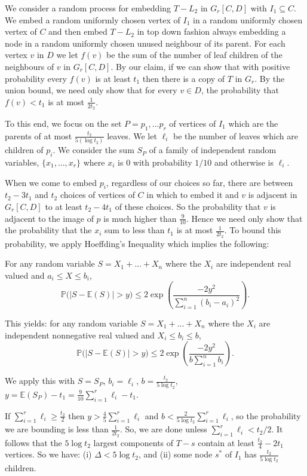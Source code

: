 \documentclass[11pt]{article}
\begin{document}
We consider a random process for embedding $T-L_2$ in $G_r[C,D]$ with $I_1 \subseteq C$. We embed a random uniformly chosen vertex 
of $I_1$ in  a random uniformly chosen vertex of $C$ and then embed $T-L_2$ in top down fashion always embedding a node in a random 
uniformly chosen unused neighbour of its parent.  For 
each vertex $v$ in $D$ we let $f(v)$ be the sum of the number of leaf children of the neighbours of $v$ in $G_r[C,D]$. 
By our claim, if we can show that with positive probability every $f(v)$ is at least $t_1$ then there is a copy of 
$T$ in $G_r$. By the union bound, we need only show that for every $v \in D$, the probability that $f(v)<t_1$ is at most $\tfrac{1}{2t_2}$. 

To this end, we focus on the set $P={p_1,...p_r}$ of vertices of $I_1$ which are the parents of at most 
$\frac{t_2}{5 (\log t_2)}$ leaves.  We let $\ell_i$ be the number of leaves which are children of $p_i$. We consider the sum $S_P$ of a family of independent random variables, $\{x_1,...,x_r\}$ where  $x_i$  is  $0$ with probability $1/10$ and otherwise is  $\ell_i$. 


When we come to embed $p_i$, regardless of our choices so far, there are between  $t_2-3t_1$  and $t_2$ choices of 
vertices of $C$ in which to embed it and $v$ is adjacent in $G_r[C,D]$ to at least $t_2-4t_1$ of these choices. So the
probability  that $v$ is adjacent to the image of $p$ is much higher than $\frac{9}{10}$. Hence we need only show that the 
probability that the $x_i$ sum to  less than $t_1$ is at most $\frac{1}{2t_2}$.
To bound this probability, we apply Hoeffding's Inequality \cite[Theorem 2]{hoef} which implies the following: 

For any random variable $S=X_1+...+X_n$ where the $X_i$ are independent real valued  and  $a_i \le X \le b_i$,  
\begin{equation*}
\mathbb{P}\big(|S-\mathbb{E}(S)| > y \big)
\le 
2\exp\left({\frac{-2y^2}{\sum_{i=1}^n(b_i-a_i)^2}}\right).
\end{equation*}

This yields: for any random variable $S=X_1+...+X_n$ where the $X_i$ are independent nonnegative real valued  and  $X_i \le b_i \le b$,  
$$
\mathbb{P}\big(|S-\mathbb{E}(S)| > y \big)
\le 
2\exp\left({\frac{-2y^2}{b\sum_{i=1}^nb_i}}\right).
$$

We apply this with $S=S_P$, $b_i=\ell_i$, $b=\frac{t_2}{5 \log t_2}$, $y=\mathbb{E}(S_P)-t_1=\frac{9}{10}{\sum_{i=1}^r\ell_i}-t_1$. 

If $\sum_{i=1}^r \ell_i \ge \frac{t_2}{2}$  then $y>\tfrac{4}{5}\sum_{i=1}^r \ell_i$ and $b< \tfrac{2}{5\log t_2}\sum_{i=1}^r \ell_i$,
so the probability we are bounding  is less than $\frac{1}{2t_2}$.  So, we are done unless $\sum_{i=1}^r \ell_i < {t_2}/{2}$.
It follows that the $5 \log t_2$ largest components of $T-s$ contain at least $\frac{t_2}4-2t_1$ vertices.
So we have:  (i) $\Delta<5 \log t_2$,  and (ii) some node $s^*$ of $I_1$ has $\frac{t_2}{5 \log t_2}$ children.
\end{document}
